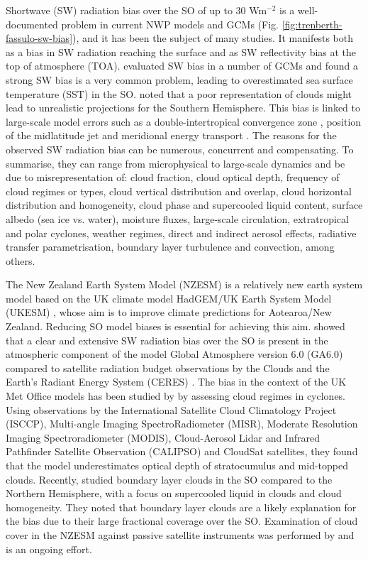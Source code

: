 Shortwave (SW) radiation bias over the SO of up to 30 Wm$^{-2}$ is a
well-documented problem in current NWP models and GCMs
\citep{trenberth2010} (Fig. \ref{fig:trenberth-fassulo-sw-bias}),
and it has been the subject of many studies.
It manifests both as a bias in SW radiation reaching the surface and as
SW reflectivity bias at the top of atmosphere (TOA).
\cite{bodas-salcedo2014} evaluated SW bias in a number
of GCMs and found a strong SW bias is a very common problem, leading to
overestimated sea surface temperature (SST) in the SO.
\cite{trenberth2010} noted that a poor representation of clouds might lead to
unrealistic projections for the Southern Hemisphere. This bias is linked to
large-scale model errors such as a double-intertropical
convergence zone \citep{hwang2013}, position of the midlatitude jet and
meridional energy transport \citep{mason2014}.
The reasons for the observed SW radiation bias
can be numerous, concurrent and compensating. To summarise, they can range
from microphysical to large-scale dynamics and be due to misrepresentation of:
cloud fraction, cloud optical depth, frequency of cloud regimes or types,
cloud vertical distribution and overlap, cloud horizontal distribution
and homogeneity, cloud phase and supercooled liquid content, surface albedo
(sea ice vs. water), moisture fluxes, large-scale circulation, extratropical
and polar cyclones, weather regimes, direct and indirect aerosol effects,
radiative transfer parametrisation, boundary layer turbulence and convection,
among others.

The New Zealand Earth System Model (NZESM)
is a relatively new earth system model based on the UK climate model HadGEM/UK Earth System Model (UKESM)
\citep{williams2016}, whose aim is to improve climate predictions for
Aotearoa/New Zealand. Reducing SO model biases is essential for
achieving this aim. \cite{walters2017}
showed that a clear and extensive SW radiation bias over the SO
is present in the atmospheric component of the model Global Atmosphere version 6.0 (GA6.0) compared to satellite
radiation budget observations by the Clouds and the Earth's Radiant Energy
System (CERES) \citep{wielicki1996}. The bias in the context of the UK Met Office
models has been studied by \cite{bodas-salcedo2012} by assessing cloud
regimes in cyclones.
Using observations by the International Satellite Cloud Climatology Project (ISCCP),
Multi-angle Imaging SpectroRadiometer (MISR), Moderate Resolution Imaging Spectroradiometer (MODIS),
Cloud-Aerosol Lidar and Infrared Pathfinder Satellite Observation
(CALIPSO) and CloudSat satellites,
they found that the model underestimates optical depth of stratocumulus and
mid-topped clouds. Recently, \cite{davies2017} studied boundary layer
clouds in the SO compared to the Northern Hemisphere,
with a focus on supercooled liquid in clouds and cloud homogeneity.
They noted that boundary layer clouds are a likely explanation for the bias
due to their large fractional coverage over the SO.
Examination of cloud cover in the NZESM against passive satellite instruments
was performed by \cite{schuddeboom2017,schuddeboom2019} and is an ongoing effort.

